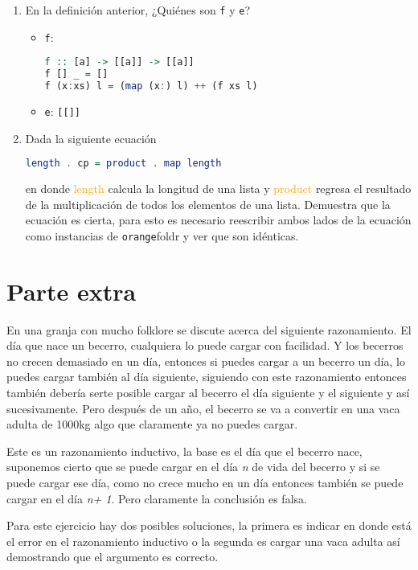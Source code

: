 \documentclass[spanish,12pt,letterpaper]{article}
\begin{document}
\begin{enumerate}
\item En la definición anterior, ¿Quiénes son \texttt{f} y \texttt{e}?
\begin{itemize}
\item \texttt{f}:
		\begin{lstlisting}[language=Haskell]
f :: [a] -> [[a]] -> [[a]]
f [] _ = []
f (x:xs) l = (map (x:) l) ++ (f xs l)\end{lstlisting}
\item \texttt{e}: \texttt{[[]]}
\end{itemize}

\item Dada la siguiente ecuación
  \begin{lstlisting}[language=Haskell]
    length . cp = product . map length
  \end{lstlisting}
  en donde \textcolor{orange}{length} calcula la longitud de una lista y
  \textcolor{orange}{product} regresa el resultado de la multiplicación de todos
  los elementos de una lista. Demuestra que la ecuación es cierta, para esto es
  necesario reescribir ambos lados de la ecuación como instancias de \texttt
  {orange}{foldr} y ver que son idénticas.
\end{enumerate}

\section{Parte extra}
En una granja con mucho folklore se discute acerca del siguiente
razonamiento.  El día que nace un becerro, cualquiera lo puede cargar con
facilidad.  Y los becerros no crecen demasiado en un día,  entonces si puedes
cargar a un becerro un día,  lo puedes cargar también al día siguiente,
siguiendo con este razonamiento entonces también debería serte posible cargar al
becerro el día siguiente y el siguiente y así sucesivamente. Pero después de un
año, el becerro se va a convertir en una vaca adulta de 1000kg algo que
claramente ya no puedes cargar.

Este es un razonamiento inductivo, la base es el día que el becerro nace,
suponemos cierto que se puede cargar en el día \textit{n} de vida del becerro y
si se puede cargar ese día, como no crece mucho en un día entonces también se
puede cargar en el día \textit{n+ 1}.  Pero claramente la conclusión es falsa.

Para este ejercicio hay dos posibles soluciones,  la primera es indicar en donde
está el error en el razonamiento inductivo o la segunda es cargar una vaca adulta
así demostrando que el argumento es correcto.\\
\end{document}
